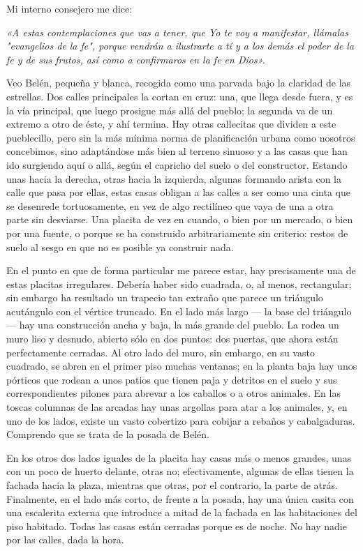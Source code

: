 \documentclass[12pt, twoside, openright]{book} %
\begin{document}
Mi interno consejero me dice: 

\emph{«A estas contemplaciones que vas a tener, que Yo te voy a manifestar, llámalas "evangelios de la fe", porque vendrán a ilustrarte a tí y a los demás el poder de la fe y de sus frutos, así como a confirmaros en la fe en Dios».}

Veo Belén, pequeña y blanca, recogida como una parvada bajo la claridad de las estrellas. Dos calles principales la cortan en cruz: una, que llega desde fuera, y es la vía principal, que luego prosigue más allá del pueblo; la segunda va de un extremo a otro de éste, y ahí termina. Hay otras callecitas que dividen a este pueblecillo, pero sin la más mínima norma de planificación urbana como nosotros concebimos, sino adaptándose más bien al terreno sinuoso y a las casas que han ido surgiendo aquí o allá, según el capricho del suelo o del constructor. Estando unas hacia la derecha, otras hacia la izquierda, algunas formando arista con la calle que pasa por ellas, estas casas obligan a las calles a ser como una cinta que se desenrede tortuosamente, en vez de algo rectilíneo que vaya de una a otra parte sin desviarse. Una placita de vez en cuando, o bien por un mercado, o bien por una fuente, o porque se ha construido arbitrariamente sin criterio: restos de suelo al sesgo en que no es posible ya construir nada. 

En el punto en que de forma particular me parece estar, hay precisamente una de estas placitas irregulares. Debería haber sido cuadrada, o, al menos, rectangular; sin embargo ha resultado un trapecio tan extraño que parece un triángulo acutángulo con el vértice truncado. En el lado más largo — la base del triángulo — hay una construcción ancha y baja, la más grande del pueblo. La rodea un muro liso y desnudo, abierto sólo en dos puntos: dos puertas, que ahora están perfectamente cerradas. Al otro lado del muro, sin embargo, en su vasto cuadrado, se abren en el primer piso muchas ventanas; en la planta baja hay unos pórticos que rodean a unos patios que tienen paja y detritos en el suelo y sus correspondientes pilones para abrevar a los caballos o a otros animales. En las toscas columnas de las arcadas hay unas argollas para atar a los animales, y, en uno de los lados, existe un vasto cobertizo para cobijar a rebaños y cabalgaduras. Comprendo que se trata de la posada de Belén. 

En los otros dos lados iguales de la placita hay casas más o menos grandes, unas con un poco de huerto delante, otras no; efectivamente, algunas de ellas tienen la fachada hacia la plaza, mientras que otras, por el contrario, la parte de atrás. Finalmente, en el lado más corto, de frente a la posada, hay una única casita con una escalerita externa que introduce a mitad de la fachada en las habitaciones del piso habitado. Todas las casas están cerradas porque es de noche. No hay nadie por las calles, dada la hora. 
\end{document}

